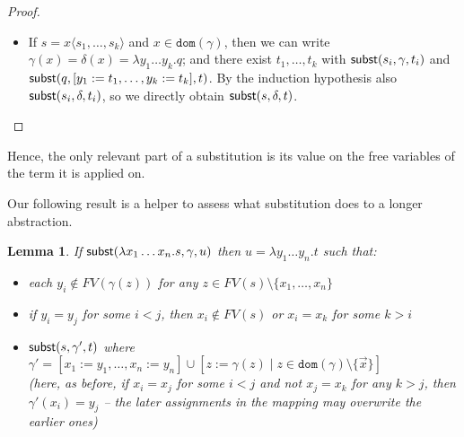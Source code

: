 \documentclass{lmcs}
\theoremstyle{theorem}\newtheorem{theorem}{Theorem}
\theoremstyle{theorem}\newtheorem{lemma}[theorem]{Lemma}
\theoremstyle{theorem}\newtheorem{corollary}[theorem]{Corollary}
\theoremstyle{definition}\newtheorem{definition}[theorem]{Definition}
\theoremstyle{definition}\newtheorem{example}[theorem]{Example}
\newcommand{\FV}{\mathit{FV}}
\newcommand{\domain}{\mathtt{dom}}
\newcommand{\avar}{x}
\newcommand{\bvar}{y}
\newcommand{\cvar}{z}
\newcommand{\abs}[2]{\lambda #1.#2}
\newcommand{\meta}[2]{#1\langle#2\rangle}
\begin{document}
\begin{proof}
{\begin{itemize}
      $\subrel{s_i,\gamma,t_i}$ and $t = \meta{x}{t_1,\dots,t_k}$.  By the induction hypothesis also
      $\subrel{s_i,\delta,t_i}$, so $\subrel{s,\delta,t}$ follows immediately.
    \item
      If $s = \meta{\avar}{s_1,\dots,s_k}$ and $\avar \in \domain(\gamma)$, then we can write
      $\gamma(\avar) = \delta(\avar) = \abs{\bvar_1 \dots \bvar_k}{q}$;
      and there exist $t_1,\dots,t_k$ with $\subrel{s_i,\gamma,t_i}$ and
      $\subrel{q,[\bvar_1:=t_1,\dots,\bvar_k:=t_k],t}$.  By the induction hypothesis also
      $\subrel{s_i,\delta,t_i}$, so we directly obtain $\subrel{s,\delta,t}$.
      \qedhere
    \end{itemize}
}
\end{proof}

Hence, the only relevant part of a substitution is its value on the free variables of the term it
is applied on.

Our following result is a helper to assess what substitution does to a longer abstraction.

\begin{lemma}\label{lem:abssubst}
If $\subrel{\abs{\avar_1 \dots \avar_n}{s},\gamma,u}$ then $u = \abs{\bvar_1 \dots \bvar_n}{t}$ such
that:
\begin{itemize}
\item each $\bvar_i \notin \FV(\gamma(\cvar))$ for any $\cvar \in \FV(s) \setminus \{\avar_1,\dots,\avar_n\}$
\item if $\bvar_i = \bvar_j$ for some $i < j$, then $\avar_i \notin \FV(s)$ or $\avar_i = \avar_k$ for some $k > i$ 
\item $\mathsf{subst}(s,\gamma',t)$ where $\gamma' = [\avar_1:=\bvar_1,\dots,\avar_n:=\bvar_n] \cup [\cvar :=
  \gamma(\cvar) \mid \cvar \in \domain(\gamma) \setminus \{\vec{\avar}\}]$ \\
  (here, as before, if $\avar_i = \avar_j$ for some $i < j$ and not $\avar_j = \avar_k$ for any $k > j$,
  then $\gamma'(\avar_i) = \bvar_j$ -- the later assignments in the mapping may overwrite the earlier ones)
\end{itemize}
\end{lemma}
\end{document}
